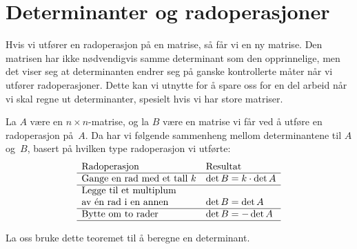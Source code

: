 \section*{Determinanter og radoperasjoner}

Hvis vi utfører en radoperasjon på en matrise, så får vi en ny
matrise.  Den matrisen har ikke nødvendigvis samme determinant som den
opprinnelige, men det viser seg at determinanten endrer seg på ganske
kontrollerte måter når vi utfører radoperasjoner.  Dette kan vi
utnytte for å spare oss for en del arbeid når vi skal regne ut
determinanter, spesielt hvis vi har store matriser.

\begin{thm}
La $A$ være en $n \times n$-matrise, og la $B$ være en matrise vi får
ved å utføre en radoperasjon på~$A$.  Da har vi følgende sammenheng
mellom determinantene til $A$ og~$B$, basert på hvilken type
radoperasjon vi utførte:
\\
\[
\begin{array}{ll}
\text{Radoperasjon} & \text{Resultat} \\\hline
\textup{Gange en rad med et tall~$k$} &
\det B = k \cdot \det A \\\hline
\textup{Legge til et multiplum}\\\textup{av én rad i en annen} &
\det B = \det A \\\hline
\textup{Bytte om to rader} &
\det B = - \det A \\\hline
\end{array}
\]
\end{thm}

La oss bruke dette teoremet til å beregne en determinant.

